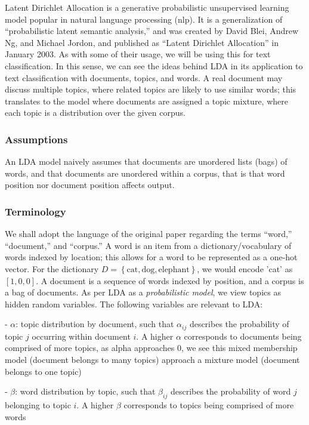 \documentclass[11pt, twoside, reqno]{book}
\begin{document}
Latent Dirichlet Allocation is a generative probabilistic unsupervised learning model popular in natural language processing (nlp). It is a generalization of ``probabilistic latent semantic analysis,'' and was created by David Blei, Andrew Ng, and Michael Jordon, and published as ``Latent Dirichlet Allocation'' in January 2003. As with some of their usage, we will be using this for text classification. In this sense, we can see the ideas behind LDA in its application to text classification with documents, topics, and words. A real document may discuss multiple topics, where related topics are likely to use similar words; this translates to the model where documents are assigned a topic mixture, where each topic is a distribution over the given corpus.

\subsubsection{Assumptions}

An LDA model naively assumes that documents are unordered lists (bags) of words, and that documents are unordered within a corpus, that is that word position nor document position affects output.

\subsubsection{Terminology}

We shall adopt the language of the original paper regarding the terms ``word,'' ``document,'' and ``corpus.'' A word is an item from a dictionary/vocabulary of words indexed by location; this allows for a word to be represented as a one-hot vector. For the dictionary $D = \left\{ \text{cat}, \text{dog}, \text{elephant} \right\}$, we would encode 'cat' as $\left[ 1, 0, 0 \right]$. A document is a sequence of words indexed by position, and a corpus is a bag of documents. As per LDA as a \textit{probabilistic model}, we view topics as hidden random variables. The following variables are relevant to LDA:

- $\alpha$: topic distribution by document, such that $\alpha_{ij}$ describes the probability of topic $j$ occurring within document $i$. A higher $\alpha$ corresponds to documents being comprised of more topics, as alpha approaches 0, we see this mixed membership model (document belongs to many topics) approach a mixture model (document belongs to one topic)

- $\beta$: word distribution by topic, such that $\beta_{ij}$ describes the probability of word $j$ belonging to topic $i$. A higher $\beta$ corresponds to topics being comprised of more words
\end{document}
